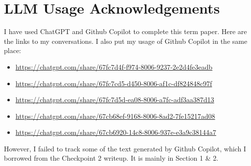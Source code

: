 \section{LLM Usage Acknowledgements}

I have used ChatGPT and Github Copilot to complete this term paper. Here are the links to my conversations. I also put my usage of Github Copilot in the same place:

\begin{itemize}
    \item \href{https://chatgpt.com/share/67fc7d4f-f974-8006-9237-2e2d4fe3eadb}{https://chatgpt.com/share/67fc7d4f-f974-8006-9237-2e2d4fe3eadb}
    \item \href{https://chatgpt.com/share/67fc7cd5-d450-8006-af1c-df824848c97f}{https://chatgpt.com/share/67fc7cd5-d450-8006-af1c-df824848c97f}
    \item \href{https://chatgpt.com/share/67fc7d5d-ea08-8006-a7fc-adf3aa387d13}{https://chatgpt.com/share/67fc7d5d-ea08-8006-a7fc-adf3aa387d13}
    \item \href{https://chatgpt.com/share/67cb68ef-9168-8006-8ad2-7fe15217ad08}{https://chatgpt.com/share/67cb68ef-9168-8006-8ad2-7fe15217ad08}
    \item \href{https://chatgpt.com/share/67cb6920-14c8-8006-937e-e3a9c38144a7}{https://chatgpt.com/share/67cb6920-14c8-8006-937e-e3a9c38144a7}
\end{itemize}

However, I failed to track some of the text generated by Github Copilot, which I borrowed from the Checkpoint 2 writeup. It is mainly in Section 1 \& 2.

